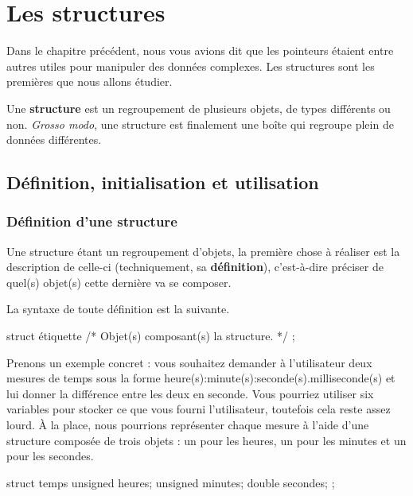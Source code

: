 \chapter{Les structures}
\label{les-structures}

Dans le chapitre précédent, nous vous avions dit que
les pointeurs étaient entre autres utiles pour manipuler des données
complexes. Les structures sont les premières que nous allons étudier.

Une \textbf{structure} est un regroupement de plusieurs objets, de types
différents ou non. \emph{Grosso modo}, une structure est finalement une
boîte qui regroupe plein de données différentes.

\section{Définition, initialisation et utilisation}
\label{definition,-initialisation-et-utilisation}

\subsection{Définition d'une structure}
\label{definition-dune-structure}

Une structure étant un regroupement d'objets, la première chose à
réaliser est la description de celle-ci (techniquement, sa
\textbf{définition}), c'est-à-dire préciser de quel(s) objet(s) cette
dernière va se composer.

La syntaxe de toute définition est la suivante.

\begin{C}
struct étiquette
{
    /* Objet(s) composant(s) la structure. */
};
\end{C}

Prenons un exemple concret : vous souhaitez demander à l'utilisateur
deux mesures de temps sous la forme
heure(s):minute(s):seconde(s).milliseconde(s) et lui donner la
différence entre les deux en seconde. Vous pourriez utiliser six
variables pour stocker ce que vous fourni l'utilisateur, toutefois cela
reste assez lourd. À la place, nous pourrions représenter chaque mesure
à l'aide d'une structure composée de trois objets : un pour les heures,
un pour les minutes et un pour les secondes.

\begin{C}
struct temps {
    unsigned heures;
    unsigned minutes;
    double secondes;
};
\end{C}

